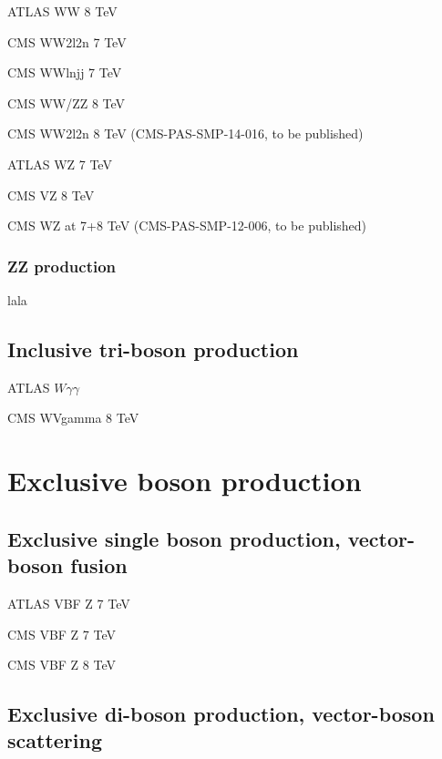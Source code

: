 \documentclass[12pt]{iopart}
\begin{document}
ATLAS WW 8 TeV~\cite{ATLAS-CONF-2014-033}

CMS WW2l2n 7 TeV~\cite{Chatrchyan:2013yaa}

CMS WWlnjj 7 TeV~\cite{Chatrchyan:2012bd}

CMS WW/ZZ 8 TeV~\cite{Chatrchyan:2013oev}

CMS WW2l2n 8 TeV (CMS-PAS-SMP-14-016, to be published)


ATLAS WZ 7 TeV~\cite{Aad:2012twa}

CMS VZ 8 TeV~\cite{Chatrchyan:2014aqa}

CMS WZ at 7+8 TeV (CMS-PAS-SMP-12-006, to be published)

\subsubsection{ZZ production}
\label{sss-ZZprod}

lala







\subsection{Inclusive tri-boson production}

ATLAS $W\gamma\gamma$~\cite{Aad:2015uqa}

CMS WVgamma 8 TeV~\cite{Chatrchyan:2014bza}

\section{Exclusive boson production}
\subsection{Exclusive single boson production, vector-boson fusion}

ATLAS VBF Z 7 TeV~\cite{Aad:2014dta}

CMS VBF Z 7 TeV~\cite{Chatrchyan:2013jya}

CMS VBF Z 8 TeV~\cite{Khachatryan:2014dea}

\subsection{Exclusive di-boson production, vector-boson scattering}
\end{document}
